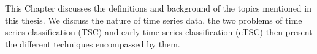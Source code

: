 This Chapter discusses the definitions and background of the topics mentioned in this thesis.
We discuss the nature of time series data, the two problems of time series classification (TSC) and early time series classification (eTSC) then present the different techniques encompassed by them.